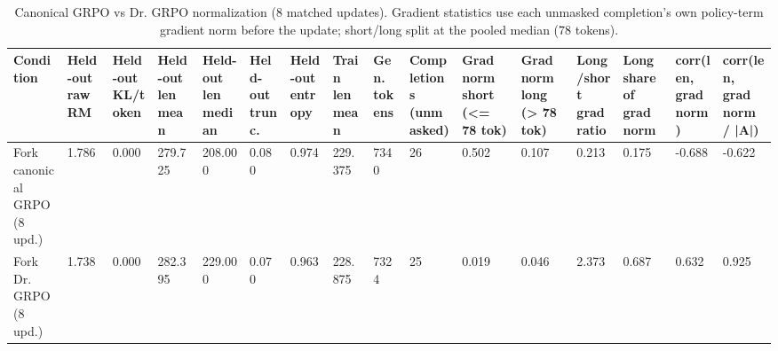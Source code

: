 \begin{table}[t]
\centering
\small
\caption{Canonical GRPO vs Dr. GRPO normalization (8 matched updates). Gradient statistics use each unmasked completion's own policy-term gradient norm before the update; short/long split at the pooled median (78 tokens).}
\begin{tabular}{llllllllllllllll}
\toprule
Condition & Held-out raw RM & Held-out KL/token & Held-out len mean & Held-out len median & Held-out trunc. & Held-out entropy & Train len mean & Gen. tokens & Completions (unmasked) & Grad norm short (<= 78 tok) & Grad norm long (> 78 tok) & Long/short grad ratio & Long share of grad norm & corr(len, grad norm) & corr(len, grad norm / |A|) \\
\midrule
Fork canonical GRPO (8 upd.) & 1.786 & 0.000 & 279.725 & 208.000 & 0.080 & 0.974 & 229.375 & 7340 & 26 & 0.502 & 0.107 & 0.213 & 0.175 & -0.688 & -0.622 \\
Fork Dr. GRPO (8 upd.) & 1.738 & 0.000 & 282.395 & 229.000 & 0.070 & 0.963 & 228.875 & 7324 & 25 & 0.019 & 0.046 & 2.373 & 0.687 & 0.632 & 0.925 \\
\bottomrule
\end{tabular}
\end{table}
